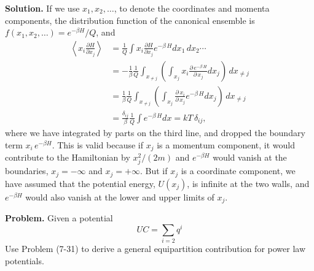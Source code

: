 \documentclass[twocolumn, 10pt]{article}
\numberwithin{equation}{section}
\newenvironment{problem}
{\par\medskip\sffamily \color{problue}
  \textbf{Problem. }\ignorespaces}
{\medskip}
\newenvironment{solution}
{\par\medskip
  \textbf{Solution. }\ignorespaces}
{\medskip}
\begin{document}
\begin{solution}
If we use $x_1, x_2, \dots$, to denote
the coordinates and momenta components,
the distribution function of the canonical ensemble
is $f(x_1, x_2, \dots) = e^{-\beta H}/Q$, and
%
\begin{align*}
  \left\langle
    x_i \frac{ \partial H } { \partial x_j }
  \right\rangle
  &=
  \frac{1}{Q} \int
    x_i \frac{ \partial H } { \partial x_j }
    e^{-\beta \, H}
    d x_1 \, d x_2 \cdots
  \\
  &=
  -
  \frac{1}{\beta}
  \frac{1}{Q}
  \int_{x_{\ne j}}
    \left(
      \int_{x_j}
      x_i \frac{ \partial \, e^{-\beta \, H} } { \partial \, x_j }
      d x_j
    \right) \, d x_{\ne j}
  \\
  &=
  \frac{1}{\beta}
  \frac{1}{Q}
  \int_{x_{\ne j}}
    \left(
      \int_{x_j}
      \frac{ \partial \, x_i } { \partial \, x_j }
      e^{-\beta \, H}
      d x_j
    \right)
  \, d x_{\ne j}
  \\
  &=
  \frac{\delta_{ij}}{\beta}
  \frac{1}{Q}
  \int e^{-\beta \, H} d x
  = kT \, \delta_{ij}
  ,
\end{align*}
where we have integrated by parts on the third line,
and dropped the boundary term $x_i \, e^{-\beta H}$.
This is valid because if $x_j$ is a momentum component,
it would contribute to the Hamiltonian by $x_j^2/(2m)$
and $e^{-\beta H}$ would vanish at the boundaries,
$x_j = -\infty$ and $x_j = +\infty$.
%
But if $x_j$ is a coordinate component,
we have assumed that the potential energy, $U(x_j)$,
is infinite at the two walls,
and $e^{-\beta H}$ would also vanish
at the lower and upper limits of $x_j$.
\end{solution}

\begin{problem}
  Given a potential
  $$
  UC = \sum_{i=2} q^i
  $$
  Use Problem (7-31) to derive a general
  equipartition contribution for power law potentials.
\end{problem}
\end{document}
